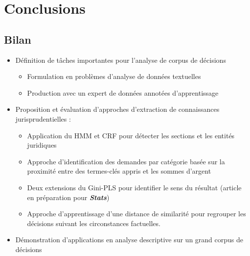 \section{Conclusions}
\subsection{Bilan}
\begin{frame}[c]{\mysubsectiontitle}	
	\begin{itemize} \small
		\item Définition de tâches importantes pour l'analyse de corpus de décisions 
		\begin{itemize} \scriptsize
			\item Formulation en problèmes d'analyse de données textuelles
			\item Production avec un expert de données annotées d'apprentissage 
		\end{itemize}
		\item Proposition et évaluation d'approches d'extraction de connaissances jurisprudentielles :
		\begin{itemize} \scriptsize
			\item Application du HMM  et CRF pour détecter les sections et les entités juridiques \cite{tagnyngompe2017neregc, tagnyngompe2019ner}
			\item Approche d'identification des demandes par catégorie basée sur la proximité entre des termes-clés appris et les sommes d'argent		
			\item Deux extensions du Gini-PLS pour identifier le sens du résultat (article en préparation pour \textit{\textbf{Stats}})
			\item Approche d'apprentissage d'une distance de similarité pour regrouper les décisions suivant les circonstances factuelles.	
		\end{itemize}
	   \item Démonstration d'applications en analyse descriptive sur un grand corpus de décisions	   
\end{itemize}
\end{frame}

